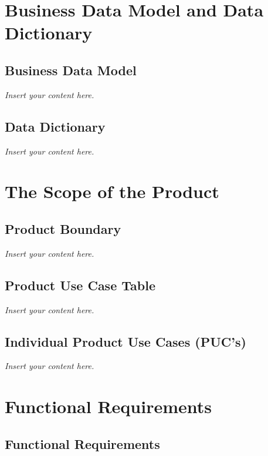 \documentclass[12pt]{article}
\newcommand{\lips}{\textit{Insert your content here.}}
\begin{document}
\section{Business Data Model and Data Dictionary}
\subsection{Business Data Model}
\lips
\subsection{Data Dictionary}
\lips

\section{The Scope of the Product}
\subsection{Product Boundary}
\lips
\subsection{Product Use Case Table}
\lips
\subsection{Individual Product Use Cases (PUC's)}
\lips

\section{Functional Requirements}
\subsection{Functional Requirements}
\end{document}
